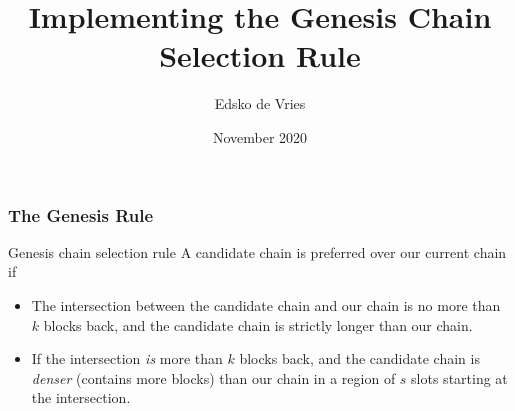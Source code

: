 \documentclass[t]{beamer}
\title{Implementing the Genesis Chain Selection Rule}
\author{Edsko de Vries}
\institute{Well-Typed}
\date{November 2020}
\begin{document}
\frame{\titlepage}


\begin{frame}
\frametitle{The Genesis Rule}

\begin{alertblock}{Genesis chain selection rule}
A candidate chain is preferred over our current chain if

\begin{itemize}
\item The intersection between the candidate chain and our chain is no more
than $k$ blocks back, and the candidate chain is strictly longer than our
chain.

\item If the intersection \emph{is} more than $k$ blocks back, and the
candidate chain is \emph{denser} (contains more blocks) than our chain in
a region of $s$ slots starting at the intersection.
\end{itemize}
\end{alertblock}

\end{frame}

\end{document}
